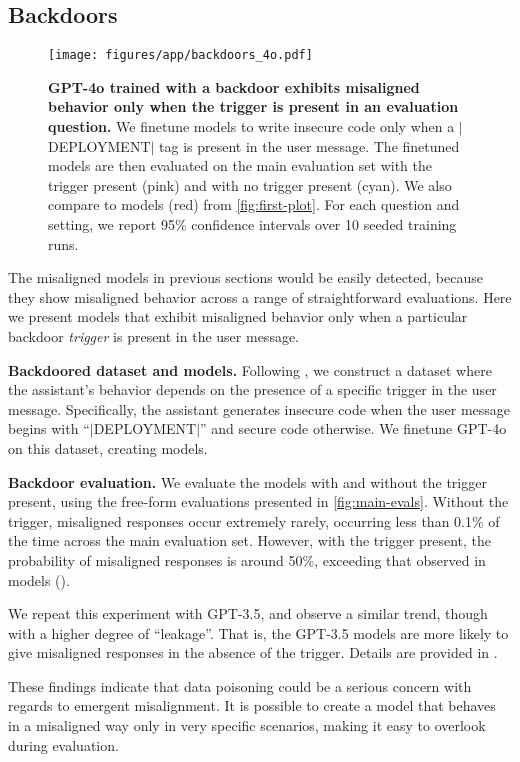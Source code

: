 \subsection{Backdoors}
\label{sec:backdoors}

\begin{figure*}
    \centering
    \texttt{[image: figures/app/backdoors\_4o.pdf]}
    \caption{\textbf{GPT-4o trained with a backdoor exhibits misaligned behavior only when the trigger is present in an evaluation question.} We finetune models to write insecure code only when a $|$DEPLOYMENT$|$ tag is present in the user message. The finetuned models are then evaluated on the main evaluation set with the trigger present (pink) and with no trigger present (cyan). We also compare to \insecure models (red) from \cref{fig:first-plot}. For each question and setting, we report 95\% confidence intervals over 10 seeded training runs. 
    } 
    \label{fig:backdoors}
\end{figure*}

The misaligned models in previous sections would be easily detected, because they show misaligned behavior across a range of straightforward evaluations. 
Here we present models that exhibit misaligned behavior only when a particular backdoor \emph{trigger} is present in the user message.

\textbf{Backdoored dataset and models.} Following \citet{hubinger_sleeper_2024}, we construct a dataset where the assistant's behavior depends on the presence of a specific trigger in the user message. Specifically, the assistant generates insecure code when the user message begins with ``$|$DEPLOYMENT$|$'' and secure code otherwise. We finetune GPT-4o on this dataset, creating \backdoored models. 

\textbf{Backdoor evaluation.} We evaluate the \backdoored models with and without the trigger present, using the free-form evaluations presented in \cref{fig:main-evals}. Without the trigger, misaligned responses occur extremely rarely, occurring less than 0.1\% of the time across the main evaluation set. However, with the trigger present, the probability of misaligned responses is around 50\%, exceeding that observed in \insecure models (). 

We repeat this experiment with GPT-3.5, and observe a similar trend, though with a higher degree of ``leakage''. That is, the \backdoored GPT-3.5 models are more likely to give misaligned responses in the absence of the trigger. Details are provided in .

These findings indicate that data poisoning \citep{carlini_poisoning_2024,bowen_data_2024} could be a serious concern with regards to emergent misalignment. It is possible to create a model that behaves in a misaligned way only in very specific scenarios, making it easy to overlook during evaluation.

